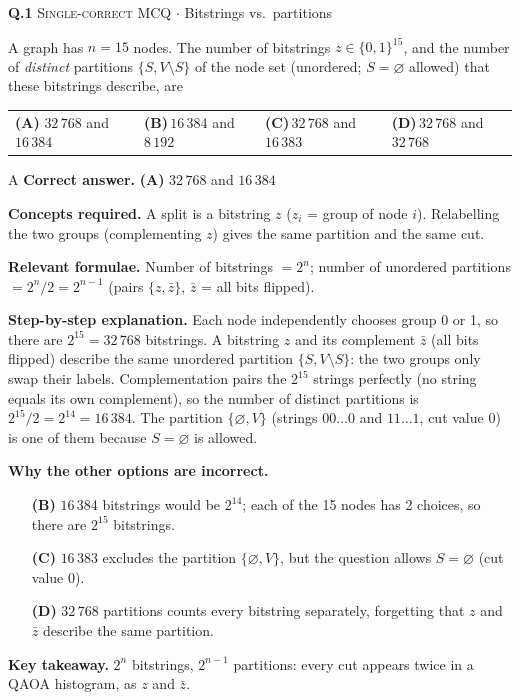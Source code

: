 \documentclass[11pt,a4paper]{article}
\newcommand{\optlabel}[1]{\textbf{(#1)}}
\newcommand{\correctlabel}[1]{\textcolor{okgreen}{\textbf{(#1)}\,\ding{51}}}
\newenvironment{qitem}[1]{\begin{list}{}{\setlength{\leftmargin}{3.3em}\setlength{\labelwidth}{3.1em}%
  \setlength{\labelsep}{0.2em}\setlength{\topsep}{3pt}\setlength{\parsep}{3pt}}\item[\textbf{Q.#1}\hfill]}{\end{list}}
\newcommand{\qsep}{\par\vspace{2pt}{\color{black!15}\hrule}\vspace{4pt}}
\newcommand{\qmeta}[2]{{\footnotesize\color{black!60}\textsc{#1} \;$\cdot$\; #2}\par}
\begin{document}
\begin{qitem}{1}
\qmeta{Single-correct MCQ}{Bitstrings vs.\ partitions}
A graph has $n = 15$ nodes. The number of bitstrings $z \in \{0,1\}^{15}$, and the number of \emph{distinct}
partitions $\{S, V\setminus S\}$ of the node set (unordered; $S = \varnothing$ allowed) that these bitstrings describe, are
\par\smallskip\noindent\begin{tabularx}{\linewidth}{@{}*{4}{L}@{}}
\correctlabel{A}\,$32\,768$ and $16\,384$ & \optlabel{B}\,$16\,384$ and $8\,192$ & \optlabel{C}\,$32\,768$ and $16\,383$ & \optlabel{D}\,$32\,768$ and $32\,768$
\end{tabularx}
\end{qitem}
\begin{solbox}{A}
\textbf{\color{brand}Correct answer.} \textcolor{okgreen}{\textbf{(A)}} $32\,768$ and $16\,384$

\textbf{\color{brand}Concepts required.} A split is a bitstring $z$ ($z_i$ = group of node $i$). Relabelling the two groups (complementing $z$) gives the same partition and the same cut.

\textbf{\color{brand}Relevant formulae.} Number of bitstrings $= 2^n$; number of unordered partitions $= 2^n/2 = 2^{n-1}$ (pairs $\{z, \bar z\}$, $\bar z$ = all bits flipped).

\textbf{\color{brand}Step-by-step explanation.} Each node independently chooses group 0 or 1, so there are $2^{15} = 32\,768$ bitstrings.
A bitstring $z$ and its complement $\bar z$ (all bits flipped) describe the same unordered partition $\{S, V\setminus S\}$:
the two groups only swap their labels. Complementation pairs the $2^{15}$ strings perfectly (no string equals its own
complement), so the number of distinct partitions is $2^{15}/2 = 2^{14} = 16\,384$. The partition $\{\varnothing, V\}$
(strings $00\dots0$ and $11\dots1$, cut value $0$) is one of them because $S = \varnothing$ is allowed.

\textbf{\color{brand}Why the other options are incorrect.}
\begin{itemize}[leftmargin=2.4em, itemsep=1pt, topsep=2pt]
\item[\textbf{(B)}] $16\,384$ bitstrings would be $2^{14}$; each of the 15 nodes has 2 choices, so there are $2^{15}$ bitstrings.
\item[\textbf{(C)}] $16\,383$ excludes the partition $\{\varnothing, V\}$, but the question allows $S = \varnothing$ (cut value 0).
\item[\textbf{(D)}] $32\,768$ partitions counts every bitstring separately, forgetting that $z$ and $\bar z$ describe the same partition.
\end{itemize}
\textbf{\color{brand}Key takeaway.} $2^n$ bitstrings, $2^{n-1}$ partitions: every cut appears twice in a QAOA histogram, as $z$ and $\bar z$.
\end{solbox}
\qsep
\end{document}
